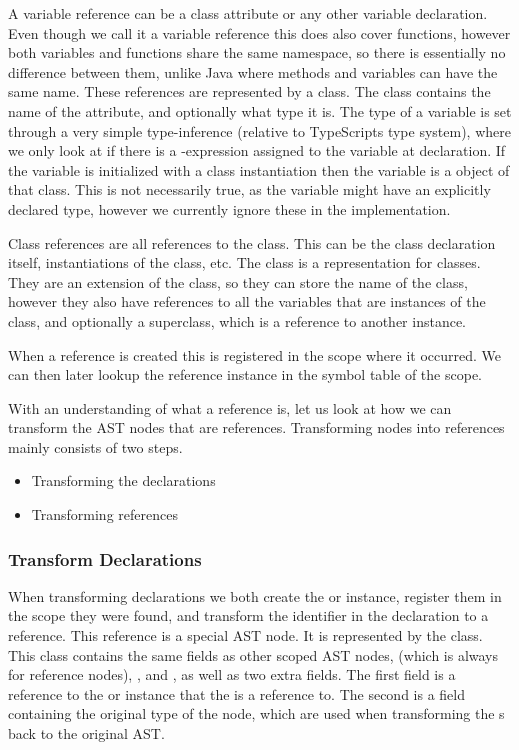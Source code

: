 A variable reference can be a class attribute or any other variable declaration.
Even though we call it a variable reference this does also cover functions, however both variables and functions share the same namespace, so there is essentially no difference between them, unlike Java where methods and variables can have the same name.
These references are represented by a  class.
The class contains the name of the attribute, and optionally what type it is.
The type of a variable is set through a very simple type-inference (relative to TypeScripts type system), where we only look at if there is a -expression assigned to the variable at declaration.
If the variable is initialized with a class instantiation then the variable is a object of that class.
This is not necessarily true, as the variable might have an explicitly declared type, however we currently ignore these in the implementation.

Class references are all references to the class.
This can be the class declaration itself, instantiations of the class, etc.
The  class is a representation for classes.
They are an extension of the  class, so they can store the name of the class, however they also have references to all the variables that are instances of the class, and optionally a superclass, which is a reference to another  instance.

When a reference is created this is registered in the scope where it occurred.
We can then later lookup the reference instance in the symbol table of the scope.

With an understanding of what a reference is, let us look at how we can transform the AST nodes that are references.
Transforming nodes into references mainly consists of two steps.

\begin{itemize}
    \item Transforming the declarations
    \item Transforming references
\end{itemize}

\subsubsection{Transform Declarations}

When transforming declarations we both create the  or  instance, register them in the scope they were found, and transform the identifier in the declaration to a reference.
This reference is a special AST node.
It is represented by the  class.
This class contains the same fields as other scoped AST nodes,  (which is always  for reference nodes), ,  and , as well as two extra fields.
The first field is a reference to the  or  instance that the  is a reference to.
The second is a field containing the original type of the node, which are used when transforming the s back to the original AST\@.


